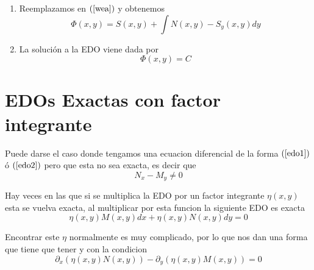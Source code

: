 \documentclass[a4paper,oneside,10.5pt]{article}
\begin{document}
\begin{enumerate}
  \item Reemplazamos en $(\ref{wea})$ y obtenemos
        \begin{equation*}
          \Phi(x, y) = S(x, y) + \int N(x, y) - S_{y}(x, y) dy
        \end{equation*}

  \item La soluci\'on a la EDO viene dada por
        \begin{equation*}
          \Phi(x, y) = C
        \end{equation*}


\end{enumerate}

\section*{EDOs Exactas con factor integrante}
Puede darse el caso donde tengamos una ecuacion diferencial de la forma $(\ref{edo1})$ \'o $(\ref{edo2})$ pero que esta no sea exacta, es decir que
\begin{equation*}
  N_{x} - M_{y} \neq 0
\end{equation*}

Hay veces en las que si se multiplica la EDO por un factor integrante $\eta(x, y)$ esta se vuelva exacta, al multiplicar por esta funcion la siguiente EDO es exacta
\begin{equation*}
  \eta(x, y) M(x, y) dx + \eta(x, y) N(x, y) dy = 0
\end{equation*}

Encontrar este $\eta$ normalmente es muy complicado, por lo que nos dan una forma que tiene que tener y con la condicion
\begin{equation*}
\partial_{x} (\eta(x, y)N(x, y)) - \partial_{y}(\eta(x, y) M(x, y)) = 0
\end{equation*}
\end{document}
